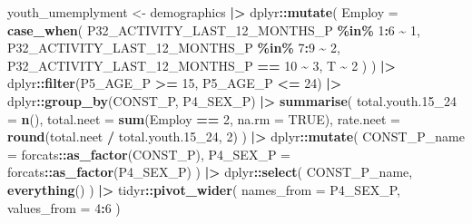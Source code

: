 \documentclass[
]{article}
\newenvironment{Shaded}{\begin{snugshade}}{\end{snugshade}}
\newcommand{\AttributeTok}[1]{\textcolor[rgb]{0.13,0.29,0.53}{#1}}
\newcommand{\ConstantTok}[1]{\textcolor[rgb]{0.56,0.35,0.01}{#1}}
\newcommand{\DecValTok}[1]{\textcolor[rgb]{0.00,0.00,0.81}{#1}}
\newcommand{\FloatTok}[1]{\textcolor[rgb]{0.00,0.00,0.81}{#1}}
\newcommand{\FunctionTok}[1]{\textcolor[rgb]{0.13,0.29,0.53}{\textbf{#1}}}
\newcommand{\NormalTok}[1]{#1}
\newcommand{\OtherTok}[1]{\textcolor[rgb]{0.56,0.35,0.01}{#1}}
\newcommand{\SpecialCharTok}[1]{\textcolor[rgb]{0.81,0.36,0.00}{\textbf{#1}}}
\begin{document}
{\begin{Shaded}
\begin{Highlighting}[]
\NormalTok{youth\_umemplyment }\OtherTok{\textless{}{-}} 
\NormalTok{  demographics }\SpecialCharTok{|\textgreater{}}
\NormalTok{  dplyr}\SpecialCharTok{::}\FunctionTok{mutate}\NormalTok{(}
    \AttributeTok{Employ =} \FunctionTok{case\_when}\NormalTok{(}
\NormalTok{      P32\_ACTIVITY\_LAST\_12\_MONTHS\_P }\SpecialCharTok{\%in\%} \DecValTok{1}\SpecialCharTok{:}\DecValTok{6} \SpecialCharTok{\textasciitilde{}} \DecValTok{1}\NormalTok{,}
\NormalTok{      P32\_ACTIVITY\_LAST\_12\_MONTHS\_P }\SpecialCharTok{\%in\%} \DecValTok{7}\SpecialCharTok{:}\DecValTok{9} \SpecialCharTok{\textasciitilde{}} \DecValTok{2}\NormalTok{,}
\NormalTok{      P32\_ACTIVITY\_LAST\_12\_MONTHS\_P }\SpecialCharTok{==} \DecValTok{10} \SpecialCharTok{\textasciitilde{}} \DecValTok{3}\NormalTok{,}
\NormalTok{      T }\SpecialCharTok{\textasciitilde{}} \DecValTok{2}
\NormalTok{    )}
\NormalTok{  ) }\SpecialCharTok{|\textgreater{}}
\NormalTok{  dplyr}\SpecialCharTok{::}\FunctionTok{filter}\NormalTok{(P5\_AGE\_P }\SpecialCharTok{\textgreater{}=} \DecValTok{15}\NormalTok{, P5\_AGE\_P }\SpecialCharTok{\textless{}=} \DecValTok{24}\NormalTok{) }\SpecialCharTok{|\textgreater{}}
\NormalTok{  dplyr}\SpecialCharTok{::}\FunctionTok{group\_by}\NormalTok{(CONST\_P, P4\_SEX\_P) }\SpecialCharTok{|\textgreater{}}
  \FunctionTok{summarise}\NormalTok{(}
    \AttributeTok{total.youth.15\_24 =} \FunctionTok{n}\NormalTok{(),}
    \AttributeTok{total.neet =} \FunctionTok{sum}\NormalTok{(Employ }\SpecialCharTok{==} \DecValTok{2}\NormalTok{, }\AttributeTok{na.rm =} \ConstantTok{TRUE}\NormalTok{),}
    \AttributeTok{rate.neet =} \FunctionTok{round}\NormalTok{(total.neet }\SpecialCharTok{/}\NormalTok{ total.youth}\FloatTok{.15}\NormalTok{\_24, }\DecValTok{2}\NormalTok{)}
\NormalTok{  ) }\SpecialCharTok{|\textgreater{}}
\NormalTok{  dplyr}\SpecialCharTok{::}\FunctionTok{mutate}\NormalTok{(}
    \AttributeTok{CONST\_P\_name =}\NormalTok{ forcats}\SpecialCharTok{::}\FunctionTok{as\_factor}\NormalTok{(CONST\_P),}
    \AttributeTok{P4\_SEX\_P =}\NormalTok{ forcats}\SpecialCharTok{::}\FunctionTok{as\_factor}\NormalTok{(P4\_SEX\_P)}
\NormalTok{  ) }\SpecialCharTok{|\textgreater{}}
\NormalTok{  dplyr}\SpecialCharTok{::}\FunctionTok{select}\NormalTok{(}
\NormalTok{    CONST\_P\_name,}
    \FunctionTok{everything}\NormalTok{()}
\NormalTok{  ) }\SpecialCharTok{|\textgreater{}}
\NormalTok{  tidyr}\SpecialCharTok{::}\FunctionTok{pivot\_wider}\NormalTok{(}
    \AttributeTok{names\_from =}\NormalTok{  P4\_SEX\_P,}
    \AttributeTok{values\_from =} \DecValTok{4}\SpecialCharTok{:}\DecValTok{6}
\NormalTok{  ) }


\end{Highlighting}
\end{Shaded}}
\end{document}
